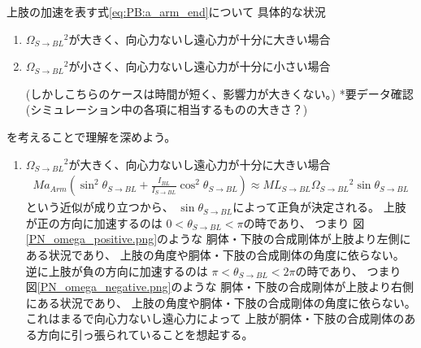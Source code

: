 \documentclass[a4paper,11pt]{jsarticle}
\begin{document}
上肢の加速を表す式\ref{eq:PB:a_arm_end}について
具体的な状況
\begin{enumerate}
  \item $\Omega_{S\rightarrow BL}{}^2$が大きく、向心力ないし遠心力が十分に大きい場合
  \item $\Omega_{S\rightarrow BL}{}^2$が小さく、向心力ないし遠心力が十分に小さい場合
  
  (しかしこちらのケースは時間が短く、影響力が大きくない。)
  *要データ確認(シミュレーション中の各項に相当するものの大きさ？)
\end{enumerate}
を考えることで理解を深めよう。


\begin{enumerate}
  \item $\Omega_{S\rightarrow BL}{}^2$が大きく、向心力ないし遠心力が十分に大きい場合
  \begin{align}
    Ma_{Arm}\left( \sin^2\theta_{S\rightarrow BL} + \frac{I_{BL}}{I_{S\rightarrow BL}}\cos^2\theta_{S\rightarrow BL} \right)
    \approx ML_{S\rightarrow BL}\Omega_{S\rightarrow BL}{}^2 \sin\theta_{S\rightarrow BL}
    \label{eq:PB:a_arm_MLw2}
  \end{align}
  という近似が成り立つから、
  $\sin\theta_{S\rightarrow BL}$によって正負が決定される。
  上肢が正の方向に加速するのは
  $0<\theta_{S\rightarrow BL}<\pi$の時であり、
  つまり
  図\ref{PN_omega_positive.png}のような
  胴体・下肢の合成剛体が上肢より左側にある状況であり、
  上肢の角度や胴体・下肢の合成剛体の角度に依らない。
  逆に上肢が負の方向に加速するのは
  $\pi<\theta_{S\rightarrow BL}<2\pi$の時であり、
  つまり
  図\ref{PN_omega_negative.png}のような
  胴体・下肢の合成剛体が上肢より右側にある状況であり、
  上肢の角度や胴体・下肢の合成剛体の角度に依らない。
  これはまるで向心力ないし遠心力によって
  上肢が胴体・下肢の合成剛体のある方向に引っ張られていることを想起する。


\end{enumerate}
\end{document}
